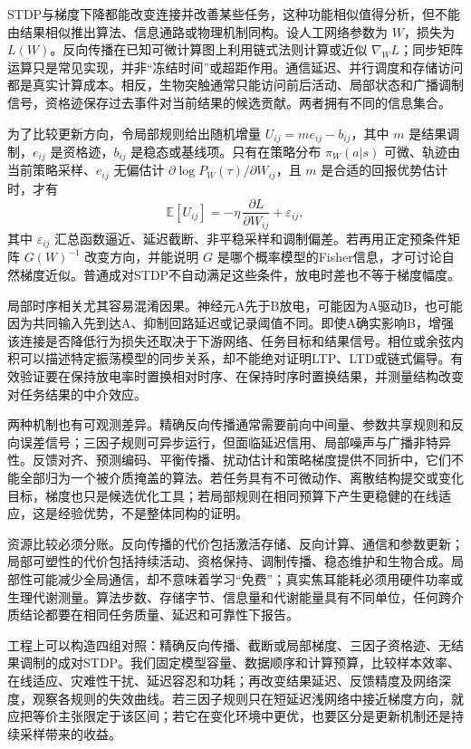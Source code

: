 STDP与梯度下降都能改变连接并改善某些任务，这种功能相似值得分析，但不能由结果相似推出算法、信息通路或物理机制同构。设人工网络参数为 $W$，损失为 $L(W)$。反向传播在已知可微计算图上利用链式法则计算或近似 $\nabla_WL$；同步矩阵运算只是常见实现，并非“冻结时间”或超距作用。通信延迟、并行调度和存储访问都是真实计算成本。相反，生物突触通常只能访问前后活动、局部状态和广播调制信号，资格迹保存过去事件对当前结果的候选贡献。两者拥有不同的信息集合。

为了比较更新方向，令局部规则给出随机增量 $U_{ij}=m e_{ij}-b_{ij}$，其中 $m$ 是结果调制，$e_{ij}$ 是资格迹，$b_{ij}$ 是稳态或基线项。只有在策略分布 $\pi_W(a|s)$ 可微、轨迹由当前策略采样、$e_{ij}$ 无偏估计 $\partial\log P_W(\tau)/\partial W_{ij}$，且 $m$ 是合适的回报优势估计时，才有
\begin{equation}
 \mathbb E[U_{ij}] = -\eta\,\frac{\partial L}{\partial W_{ij}}+\varepsilon_{ij},
\end{equation}
其中 $\varepsilon_{ij}$ 汇总函数逼近、延迟截断、非平稳采样和调制偏差。若再用正定预条件矩阵 $G(W)^{-1}$ 改变方向，并能说明 $G$ 是哪个概率模型的Fisher信息，才可讨论自然梯度近似。普通成对STDP不自动满足这些条件，放电时差也不等于梯度幅度。

局部时序相关尤其容易混淆因果。神经元A先于B放电，可能因为A驱动B，也可能因为共同输入先到达A、抑制回路延迟或记录阈值不同。即使A确实影响B，增强该连接是否降低行为损失还取决于下游网络、任务目标和结果信号。相位或余弦内积可以描述特定振荡模型的同步关系，却不能绝对证明LTP、LTD或链式偏导。有效验证要在保持放电率时置换相对时序、在保持时序时置换结果，并测量结构改变对任务结果的中介效应。

两种机制也有可观测差异。精确反向传播通常需要前向中间量、参数共享规则和反向误差信号；三因子规则可异步运行，但面临延迟信用、局部噪声与广播非特异性。反馈对齐、预测编码、平衡传播、扰动估计和策略梯度提供不同折中，它们不能全部归为一个被介质掩盖的算法。若任务具有不可微动作、离散结构提交或变化目标，梯度也只是候选优化工具；若局部规则在相同预算下产生更稳健的在线适应，这是经验优势，不是整体同构的证明。

资源比较必须分账。反向传播的代价包括激活存储、反向计算、通信和参数更新；局部可塑性的代价包括持续活动、资格保持、调制传播、稳态维护和生物合成。局部性可能减少全局通信，却不意味着学习“免费”；真实焦耳能耗必须用硬件功率或生理代谢测量。算法步数、存储字节、信息量和代谢能量具有不同单位，任何跨介质结论都要在相同任务质量、延迟和可靠性下报告。

工程上可以构造四组对照：精确反向传播、截断或局部梯度、三因子资格迹、无结果调制的成对STDP。我们固定模型容量、数据顺序和计算预算，比较样本效率、在线适应、灾难性干扰、延迟容忍和功耗；再改变结果延迟、反馈精度及网络深度，观察各规则的失效曲线。若三因子规则只在短延迟浅网络中接近梯度方向，就应把等价主张限定于该区间；若它在变化环境中更优，也要区分是更新机制还是持续采样带来的收益。

